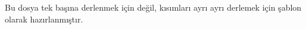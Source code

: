 \documentclass[openany]{memoir}
\begin{document}
Bu dosya tek başına derlenmek için değil, kısımları ayrı ayrı derlemek için şablon olarak hazırlanmıştır.
\end{document}
